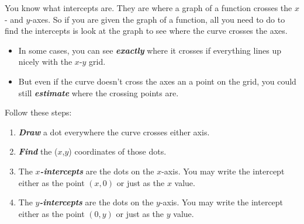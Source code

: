 \documentclass[fleqn,letterpaper,12pt,printwatermark=false]{memoir}
\begin{document}
\begin{myLesson}[][2]
    You know what intercepts are.
    They are where a graph of a function crosses the $x$- and $y$-axes.
    So if you are given the graph of a function,
    all you need to do to find the intercepts 
    is look at the graph to see where the curve crosses the axes.
    \begin{itemize}
        \item In some cases, you can see {\bfseries\itshape exactly} where it crosses
        if everything lines up nicely with the $x$-$y$ grid.
        \item But even if the curve doesn't cross the axes 
        an a point on the grid, you could still {\bfseries\itshape estimate} where 
        the crossing points are.
    \end{itemize}
\end{myLesson}

\begin{myKeyConcepts}
    Follow these steps:
    \begin{enumerate}
        \item {\bfseries\itshape Draw} a dot everywhere the curve crosses either axis.
        \item {\bfseries\itshape Find} the ($x$,$y$) coordinates of those dots.
        \item The {\bfseries\itshape $x$-intercepts} are the dots on the $x$-axis.
        You may write the intercept either as the point $(x,0)$ 
        or just as the $x$ value.
        \item The {\bfseries\itshape $y$-intercepts} are the dots on the $y$-axis.
        You may write the intercept either as the point $(0,y)$ 
        or just as the $y$ value.
    \end{enumerate}
\end{myKeyConcepts}

\end{document}

